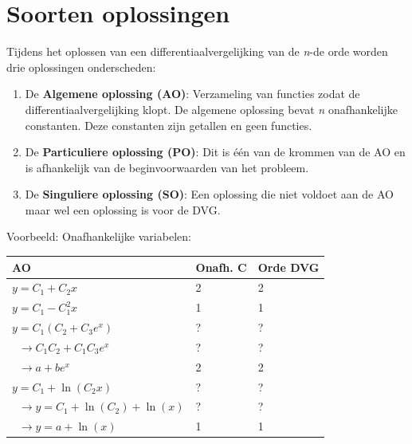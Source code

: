 \documentclass[12pt]{report}
\newcommand{\example}[2]{
      \hrulefill
      
      Voorbeeld: #1
      
      #2
      
      \hrulefill
}
\begin{document}
\section{Soorten oplossingen}
Tijdens het oplossen van een differentiaalvergelijking van de \textit{n}-de orde worden drie oplossingen onderscheden:
\begin{enumerate}
 \item De \textbf{Algemene oplossing (AO)}: Verzameling van functies zodat de differentiaalvergelijking klopt. De algemene oplossing bevat \textit{n }onafhankelijke constanten. Deze constanten zijn getallen en geen functies.
 \item De \textbf{Particuliere oplossing (PO)}: Dit is één van de krommen van de AO en is afhankelijk van de beginvoorwaarden van het probleem.
 \item De \textbf{Singuliere oplossing (SO)}: Een oplossing die niet voldoet aan de AO maar wel een oplossing is voor de DVG.
\end{enumerate}
\example{Onafhankelijke variabelen:}
{
  \begin{center}
    \begin{tabular}{l | l | l}
      AO & Onafh. C & Orde DVG \\
      \hline
      $y = C_1 + C_2x$ & 2 & 2 \\
      $y = C_1  - C_1^2x$ & 1 & 1 \\
      \hline
      $y = C_1(C_2 + C_3e^x)$ & ? & ? \\
      $\;\;\rightarrow C_1C_2 + C_1C_3e^x$ & ? & ? \\
      $\;\;\rightarrow a + be^x$ & 2 & 2 \\
      \hline
      $y = C_1 + \ln(C_2 x)$ & ? & ? \\
      $\;\;\rightarrow y = C_1 + \ln(C_2) + \ln(x)$ & ? & ? \\
      $\;\;\rightarrow y = a + \ln(x)$ & 1 & 1

   
    \end{tabular}
  \end{center}
}
\end{document}
